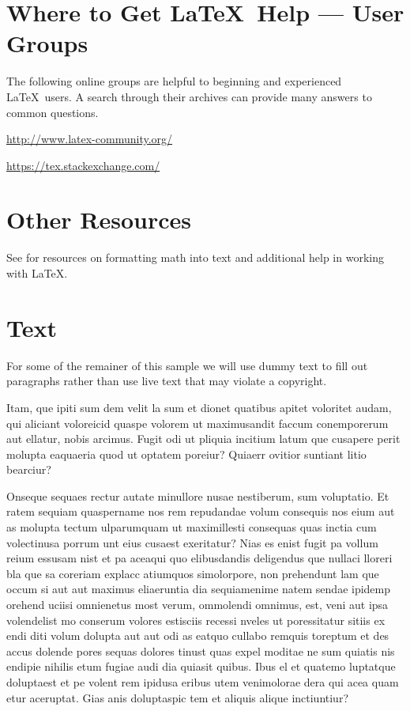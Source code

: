 \documentclass[journal]{IEEEtran}
\begin{document}
\section{Where to Get \LaTeX \ Help --- User Groups}
The following online groups are helpful to beginning and experienced \LaTeX\ users. A search through their archives can provide many answers to common questions.
\begin{list}{}{}
\item{\url{http://www.latex-community.org/}} 
\item{\url{https://tex.stackexchange.com/} }
\end{list}

\section{Other Resources}
See \cite{ref1} for resources on formatting math into text and additional help in working with \LaTeX .

\section{Text}
For some of the remainer of this sample we will use dummy text to fill out paragraphs rather than use live text that may violate a copyright.

Itam, que ipiti sum dem velit la sum et dionet quatibus apitet voloritet audam, qui aliciant voloreicid quaspe volorem ut maximusandit faccum conemporerum aut ellatur, nobis arcimus.
Fugit odi ut pliquia incitium latum que cusapere perit molupta eaquaeria quod ut optatem poreiur? Quiaerr ovitior suntiant litio bearciur?

Onseque sequaes rectur autate minullore nusae nestiberum, sum voluptatio. Et ratem sequiam quaspername nos rem repudandae volum consequis nos eium aut as molupta tectum ulparumquam ut maximillesti consequas quas inctia cum volectinusa porrum unt eius cusaest exeritatur? Nias es enist fugit pa vollum reium essusam nist et pa aceaqui quo elibusdandis deligendus que nullaci lloreri bla que sa coreriam explacc atiumquos simolorpore, non prehendunt lam que occum si aut aut maximus eliaeruntia dia sequiamenime natem sendae ipidemp orehend uciisi omnienetus most verum, ommolendi omnimus, est, veni aut ipsa volendelist mo conserum volores estisciis recessi nveles ut poressitatur sitiis ex endi diti volum dolupta aut aut odi as eatquo cullabo remquis toreptum et des accus dolende pores sequas dolores tinust quas expel moditae ne sum quiatis nis endipie nihilis etum fugiae audi dia quiasit quibus.
\IEEEpubidadjcol
Ibus el et quatemo luptatque doluptaest et pe volent rem ipidusa eribus utem venimolorae dera qui acea quam etur aceruptat.
Gias anis doluptaspic tem et aliquis alique inctiuntiur?
\end{document}
